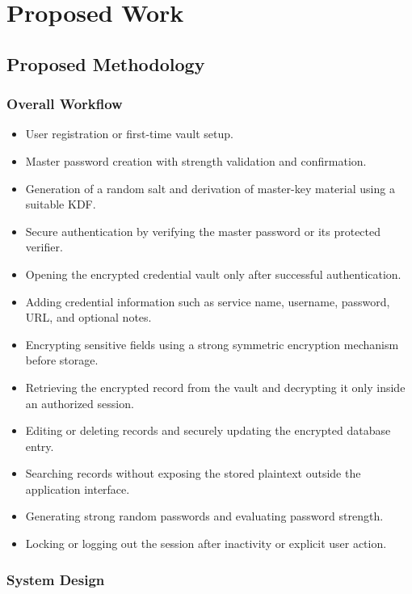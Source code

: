 \documentclass[12pt,a4paper,oneside]{report}
\begin{document}
\chapter{Proposed Work}

\section{Proposed Methodology}

\subsection{Overall Workflow}

\begin{itemize}
\item User registration or first-time vault setup.
\item Master password creation with strength validation and confirmation.
\item Generation of a random salt and derivation of master-key material using a suitable KDF.
\item Secure authentication by verifying the master password or its protected verifier.
\item Opening the encrypted credential vault only after successful authentication.
\item Adding credential information such as service name, username, password, URL, and optional notes.
\item Encrypting sensitive fields using a strong symmetric encryption mechanism before storage.
\item Retrieving the encrypted record from the vault and decrypting it only inside an authorized session.
\item Editing or deleting records and securely updating the encrypted database entry.
\item Searching records without exposing the stored plaintext outside the application interface.
\item Generating strong random passwords and evaluating password strength.
\item Locking or logging out the session after inactivity or explicit user action.
\end{itemize}

\subsection{System Design}
\end{document}

